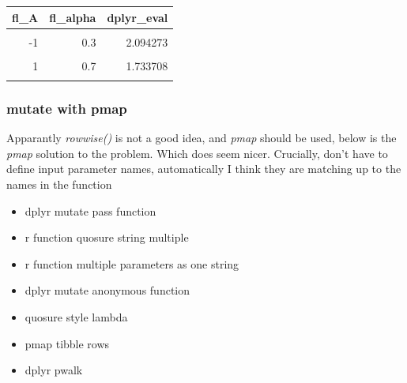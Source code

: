 \documentclass[
]{book}
\providecommand{\tightlist}{%
  \setlength{\itemsep}{0pt}\setlength{\parskip}{0pt}}
\begin{document}
\begin{table}[!h]
\centering
\begin{tabular}{r|r|r}
\hline
fl\_A & fl\_alpha & dplyr\_eval\\
\hline
\cellcolor{gray!6}{-2} & \cellcolor{gray!6}{0.1} & \cellcolor{gray!6}{2.346356}\\
\hline
-1 & 0.3 & 2.094273\\
\hline
\cellcolor{gray!6}{0} & \cellcolor{gray!6}{0.5} & \cellcolor{gray!6}{1.895316}\\
\hline
1 & 0.7 & 1.733708\\
\hline
\cellcolor{gray!6}{2} & \cellcolor{gray!6}{0.9} & \cellcolor{gray!6}{1.599477}\\
\hline
\end{tabular}
\end{table}

\hypertarget{mutate-with-pmap}{%
\subsubsection{mutate with pmap}\label{mutate-with-pmap}}

Apparantly \emph{rowwise()} is not a good idea, and \emph{pmap} should be used, below is the \emph{pmap} solution to the problem. Which does seem nicer. Crucially, don't have to define input parameter names, automatically I think they are matching up to the names in the function

\begin{itemize}
\tightlist
\item
  dplyr mutate pass function
\item
  r function quosure string multiple
\item
  r function multiple parameters as one string
\item
  dplyr mutate anonymous function
\item
  quosure style lambda
\item
  pmap tibble rows
\item
  dplyr pwalk
\end{itemize}
\end{document}
